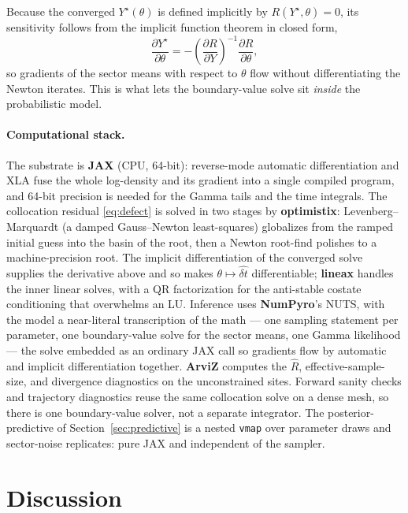 \documentclass[11pt]{article}
\begin{document}
Because the converged $Y^\star(\theta)$ is defined implicitly by $R(Y^\star, \theta) = 0$, its sensitivity follows from the implicit function theorem in closed form,
\begin{equation*}
\frac{\partial Y^\star}{\partial \theta} = -\left(\frac{\partial R}{\partial Y}\right)^{-1}\frac{\partial R}{\partial \theta},
\end{equation*}
so gradients of the sector means with respect to $\theta$ flow without differentiating the Newton iterates. This is what lets the boundary-value solve sit \emph{inside} the probabilistic model.

\paragraph{Computational stack.} The substrate is \textbf{JAX} (CPU, 64-bit): reverse-mode automatic differentiation and XLA fuse the whole log-density and its gradient into a single compiled program, and 64-bit precision is needed for the Gamma tails and the time integrals. The collocation residual \eqref{eq:defect} is solved in two stages by \textbf{optimistix}: Levenberg--Marquardt (a damped Gauss--Newton least-squares) globalizes from the ramped initial guess into the basin of the root, then a Newton root-find polishes to a machine-precision root. The implicit differentiation of the converged solve supplies the derivative above and so makes $\theta \mapsto \hat{\delta t}$ differentiable; \textbf{lineax} handles the inner linear solves, with a QR factorization for the anti-stable costate conditioning that overwhelms an LU. Inference uses \textbf{NumPyro}'s NUTS, with the model a near-literal transcription of the math --- one sampling statement per parameter, one boundary-value solve for the sector means, one Gamma likelihood --- the solve embedded as an ordinary JAX call so gradients flow by automatic and implicit differentiation together. \textbf{ArviZ} computes the $\hat R$, effective-sample-size, and divergence diagnostics on the unconstrained sites. Forward sanity checks and trajectory diagnostics reuse the same collocation solve on a dense mesh, so there is one boundary-value solver, not a separate integrator. The posterior-predictive of Section~\ref{sec:predictive} is a nested \texttt{vmap} over parameter draws and sector-noise replicates: pure JAX and independent of the sampler.

\section{Discussion}\label{sec:discussion}
\end{document}
